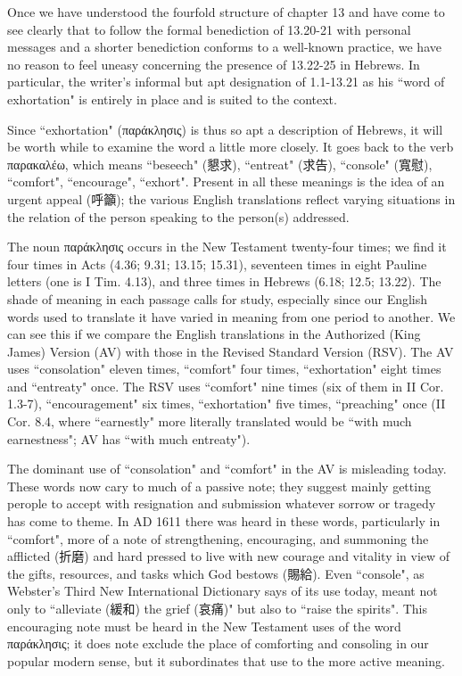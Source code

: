 Once we have understood the fourfold structure of chapter 13 and have come to
see clearly that to follow the formal benediction of 13.20-21 with personal
messages and a shorter benediction conforms to a well-known practice, we have
no reason to feel uneasy concerning the presence of 13.22-25 in Hebrews.
In particular, the writer's informal but apt designation of 1.1-13.21 as his
``word of exhortation" is entirely in place and is suited to the context.
\newline

Since ``exhortation" (παράκλησις) is thus so apt a description of Hebrews, it
will be worth while to examine the word a little more closely.
It goes back to the verb παρακαλέω, which means ``beseech" (懇求),
``entreat" (求告), ``console" (寬慰), ``comfort", ``encourage", ``exhort".
Present in all these meanings is the idea of an urgent appeal (呼籲); the
various English translations reflect varying situations in the relation of the
person speaking to the person(s) addressed.
\newline

The noun παράκλησις occurs in the New Testament twenty-four times; we find it
four times in Acts (4.36; 9.31; 13.15; 15.31), seventeen times in eight Pauline
letters (one is I Tim. 4.13), and three times in Hebrews (6.18; 12.5; 13.22).
The shade of meaning in each passage calls for study, especially since our
English words used to translate it have varied in meaning from one period to
another.
We can see this if we compare the English translations in the Authorized (King
James) Version (AV) with those in the Revised Standard Version (RSV).
The AV uses ``consolation" eleven times, ``comfort" four times, ``exhortation"
eight times and ``entreaty" once.
The RSV uses ``comfort" nine times (six of them in II Cor. 1.3-7),
``encouragement" six times, ``exhortation" five times, ``preaching" once
(II Cor. 8.4, where ``earnestly" more literally translated would be ``with much
earnestness"; AV has ``with much entreaty").
\newline

The dominant use of ``consolation" and ``comfort" in the AV is misleading today.
These words now cary to much of a passive note; they suggest mainly getting
perople to accept with resignation and submission whatever sorrow or tragedy
has come to theme.
In AD 1611 there was heard in these words, particularly in ``comfort", more of
a note of strengthening, encouraging, and summoning the afflicted (折磨) and
hard pressed to live with new courage and vitality in view of the gifts,
resources, and tasks which God bestows (賜給).
Even ``console", as Webster's Third New International Dictionary says of its
use today, meant not only to ``alleviate (緩和) the grief (哀痛)" but also to
``raise the spirits".
This encouraging note must be heard in the New Testament uses of the word
παράκλησις; it does note exclude the place of comforting and consoling in our
popular modern sense, but it subordinates that use to the more active meaning.
\newline

